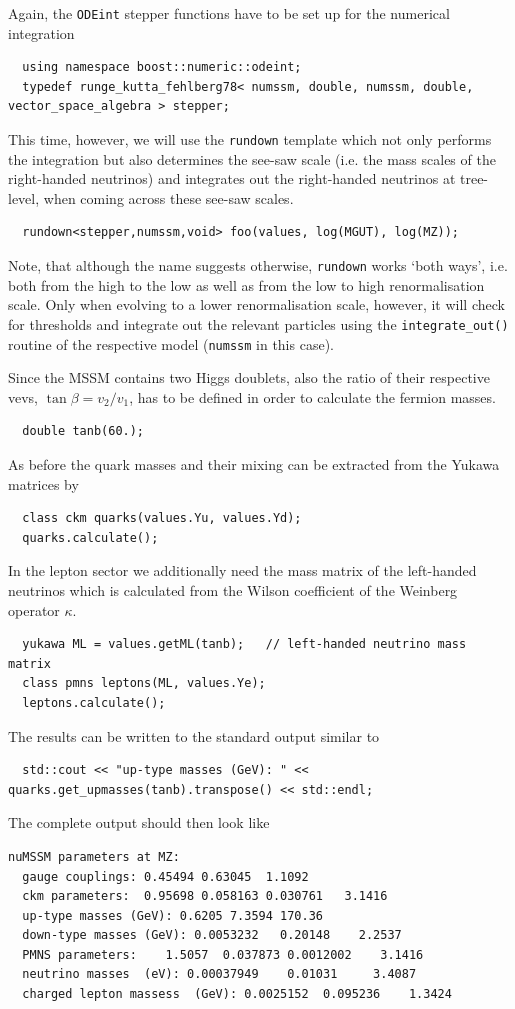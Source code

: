 \documentclass[preprint,12pt]{elsarticle}
\begin{document}
Again, the \texttt{ODEint} stepper functions have to be set up for the numerical integration
\begin{lstlisting}
  using namespace boost::numeric::odeint;
  typedef runge_kutta_fehlberg78< numssm, double, numssm, double, vector_space_algebra > stepper;
\end{lstlisting}
This time, however, we will use the \texttt{rundown} template which not only performs the integration but also determines the see-saw scale (i.e. the mass scales of the right-handed neutrinos) and integrates out the right-handed neutrinos at tree-level, when coming across these see-saw scales.
\begin{lstlisting}
  rundown<stepper,numssm,void> foo(values, log(MGUT), log(MZ));
\end{lstlisting}
Note, that although the name suggests otherwise, \texttt{rundown} works `both ways', i.e. both from the high to the low as well as from the low to high renormalisation scale. Only when evolving to a lower renormalisation scale, however, it will check for thresholds and integrate out the relevant particles using the \texttt{integrate\_out()} routine of the respective model (\texttt{numssm} in this case).
  
Since the MSSM contains two Higgs doublets, also the ratio of their respective vevs, $\tan\beta = v_2 / v_1$, has to be defined in order to calculate the fermion masses.
\begin{lstlisting}
  double tanb(60.);
\end{lstlisting}
As before the quark masses and their mixing can be extracted from the Yukawa matrices by
\begin{lstlisting}
  class ckm quarks(values.Yu, values.Yd);
  quarks.calculate();
\end{lstlisting}
In the lepton sector we additionally need the mass matrix of the left-handed neutrinos which is calculated from the Wilson coefficient of the Weinberg operator $\kappa$.
\begin{lstlisting}
  yukawa ML = values.getML(tanb);   // left-handed neutrino mass matrix
  class pmns leptons(ML, values.Ye);
  leptons.calculate();
\end{lstlisting}
The results can be written to the standard output similar to
\begin{lstlisting}
  std::cout << "up-type masses (GeV): " << quarks.get_upmasses(tanb).transpose() << std::endl;
\end{lstlisting}    
The complete output should then look like
\begin{lstlisting}[keywordstyle=\color{blue}]
  nuMSSM parameters at MZ:
  gauge couplings: 0.45494 0.63045  1.1092
  ckm parameters:  0.95698 0.058163 0.030761   3.1416
  up-type masses (GeV): 0.6205 7.3594 170.36
  down-type masses (GeV): 0.0053232   0.20148    2.2537
  PMNS parameters:    1.5057  0.037873 0.0012002    3.1416
  neutrino masses  (eV): 0.00037949    0.01031     3.4087
  charged lepton massess  (GeV): 0.0025152  0.095236    1.3424
\end{lstlisting}    
\end{document}
